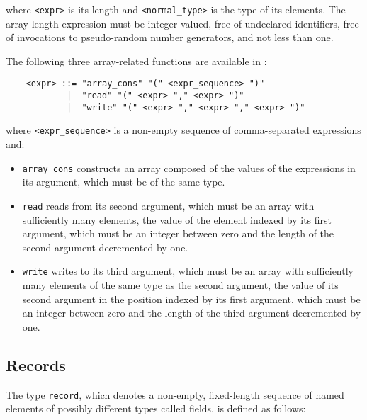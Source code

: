\noindent where {\tt <expr>} is its length and {\tt <normal\_type>} is the type of its elements. The array
length expression must be integer valued, free of undeclared identifiers, free of invocations to
pseudo-random number generators, and not less than one.

The following three array-related functions are available in \aemilia:

	\begin{verbatim}
    <expr> ::= "array_cons" "(" <expr_sequence> ")"
            |  "read" "(" <expr> "," <expr> ")"
            |  "write" "(" <expr> "," <expr> "," <expr> ")"
	\end{verbatim}

\noindent where {\tt <expr\_sequence>} is a non-empty sequence of comma-separated expressions and:

	\begin{itemize}

\item {\tt array\_cons} constructs an array composed of the values of the expressions in its argument, which
must be of the same type.

\item {\tt read} reads from its second argument, which must be an array with sufficiently many elements, the
value of the element indexed by its first argument, which must be an integer between zero and the length of
the second argument decremented by one.

\item {\tt write} writes to its third argument, which must be an array with sufficiently many elements of
the same type as the second argument, the value of its second argument in the position indexed by its first
argument, which must be an integer between zero and the length of the third argument decremented by one.

	\end{itemize}


\subsection{Records}

The type {\tt record}, which denotes a non-empty, fixed-length sequence of named elements of possibly
different types called fields, is defined as follows:


